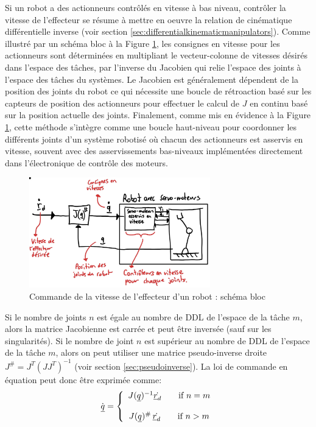 Si un robot a des actionneurs contrôlés en vitesse à bas niveau, contrôler la vitesse de l'effecteur se résume à mettre en oeuvre la relation de cinématique différentielle inverse (voir section \ref{sec:differentialkinematicmanipulators}).  Comme illustré par un schéma bloc à la Figure \ref{fig:robotspeedcontrol}, les consignes en vitesse pour les actionneurs sont déterminées en multipliant le vecteur-colonne de vitesses désirés dans l'espace des tâches, par l'inverse du Jacobien qui relie l'espace des joints à l'espace des tâches du systèmes. Le Jacobien est généralement dépendent de la position des joints du robot ce qui nécessite une boucle de rétroaction basé sur les capteurs de position des actionneurs pour effectuer le calcul de $J$ en continu basé sur la position actuelle des joints. Finalement, comme mis en évidence à la Figure \ref{fig:robotspeedcontrol}, cette méthode s'intègre comme une boucle haut-niveau pour coordonner les différents joints d'un système robotisé où chacun des actionneurs est asservis en vitesse, souvent avec des asservissements bas-niveaux implémentées directement dans l'électronique de contrôle des moteurs. 
\begin{figure}[H]
	\centering
		\includegraphics[width=0.7\textwidth]{fig/robotspeedcontrol.jpg}
	\caption{Commande de la vitesse de l'effecteur d'un robot : schéma bloc}
	\label{fig:robotspeedcontrol}
\end{figure}

Si le nombre de joints $n$ est égale au nombre de DDL de l'espace de la tâche $m$, alors la matrice Jacobienne est carrée et peut être inversée (sauf sur les singularités). Si le nombre de joint $n$ est supérieur au nombre de DDL de l'espace de la tâche $m$, alors on peut utiliser une matrice pseudo-inverse droite $J^{\#} = J^T (J J^T)^{-1}$ (voir section \ref{sec:pseudoinverse}). La loi de commande en équation peut donc être exprimée comme:
\begin{align}
\dot{\underline{q}} = \left\{ \begin{array}{c}
 J(\underline{q})^{-1} \dot{\underline{r}_d}   \quad\quad \text{if $n=m$}
 \\ \\
 J(\underline{q})^{\#} \, \dot{\underline{r}_d}   \quad\quad \text{if $n>m$}
\end{array}
\right.
\end{align}

